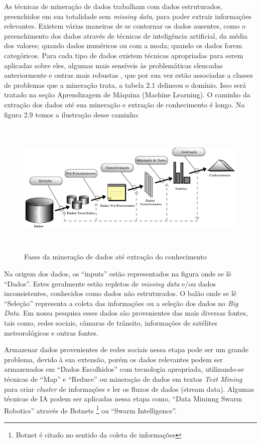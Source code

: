 As técnicas de mineração de dados trabalham com dados estruturados, preenchidos em sua totalidade sem \textit{missing data}, para poder extrair informações relevantes.
Existem várias maneiras de se contornar os dados ausentes, como o preenchimento dos dados através de técnicas de inteligência artificial, da média dos valores; quando dados numéricos 
ou com a moda; quando os dados forem categóricos. Para cada tipo de dados existem técnicas apropriadas para serem aplicadas sobre eles, algumas mais sensíveis às problemáticas elencadas anteriormente
e outras mais robustas \cite{DataMining2}, que por sua vez estão associadas a classes de problemas que a mineração trata, a tabela 2.1 delineou o domínio.
Isso será tratado na seção Aprendizagem de Máquina (Machine Learning).
O caminho da extração dos dados até sua mineração e extração de conhecimento é longo.
Na figura 2.9 temos a ilustração desse caminho:

\begin{figure}[!ht]
\centering
\caption{Fases da mineração de dados até extração do conhecimento}
\includegraphics[width=135mm, height=65mm]{Figuras/BigData/Fayyad.png}
\end{figure}


Na origem dos dados, os ``inputs'' estão representados na figura onde se lê ``Dados''. Estes geralmente estão repletos de \textit{missing data} e/ou dados inconsistentes, conhecidos como dados não estruturados. 
O balão onde se lê ``Seleção'' representa a coleta das informações ou a seleção dos dados no \textit{Big Data}.
Em nossa pesquisa esses dados são provenientes das mais diversas fontes, tais como, redes sociais, câmaras de trânsito, informações de satélites meteorológicos e outras fontes.

Armazenar dados provenientes de redes sociais nessa etapa pode ser um grande problema, devido à sua extensão, porém os dados relevantes podem ser armazenados em ``Dados Escolhidos'' 
com tecnologia apropriada, utilizando-se técnicas de ``Map'' e ``Reduce'' ou mineração de dados em textos \textit{Text Mining} para criar \textit{cluster} de informações e ler os fluxos de dados (stream data). 
Algumas técnicas de IA podem ser aplicadas nessa etapa como, ``Data Mininng Swarm Robotics'' através de Botnets \footnote{Botnet é citado no sentido da coleta de informações} ou ``Swarm Intelligence''.

